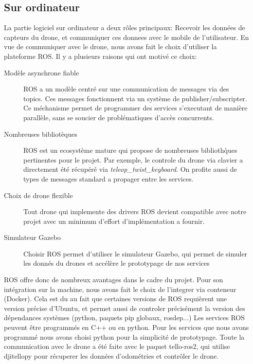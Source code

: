\documentclass{article}
\begin{document}
\subsection{Sur ordinateur}
La partie logiciel sur ordinateur a deux r\^oles principaux: Recevoir les donn\'ees de
capteurs du drone, et communiquer ces donnees avec le mobile de l'utilisateur.
En vue de communiquer avec le drone, nous avons fait le choix d'utiliser la
plateforme ROS. Il y a plusieurs raisons qui ont motiv\'e ce choix:
\begin{description}
    \item[Mod\`ele asynchrone fiable] ROS a un mod\`ele centr\'e sur une
    communication de messages via des topics. Ces messages fonctionnent via un syst\`eme de publisher/subscripter. Ce m\'echanisme permet de programmer des services s'executant de mani\`ere parall\`ele, sans se soucier de probl\'ematiques d'acc\`es concurrents.
    \item[Nombreuses bibliot\`eques] ROS est un ecosyst\`eme mature qui propose
    de nombreuses biblioth\`ques pertinentes pour le projet. Par exemple, le
    controle du drone via clavier a directement \'et\'e r\'ecup\'er\'e via
    \textit{teleop\_twist\_keyboard}. On profite aussi de types de messages standard a propager entre les services.
    \item[Choix de drone flexible] Tout drone qui implemente des drivers ROS
    devient compatible avec notre projet avec un minimum d'effort
    d'impl\'ementation a fournir.
    \item[Simulateur Gazebo] Choisir ROS permet d'utiliser le simulateur Gazebo, qui permet de simuler les donn\'es du drones et acc\'el\`ere le prototypage de nos services
\end{description}
ROS offre donc de nombreux avantages dans le cadre du projet. Pour son
int\'egration sur la machine, nous avons fait le choix de l'integrer via
conteneur (Docker). Cela est du au fait que certaines versions de ROS
requi\`erent une version pr\'ecise d'Ubuntu, et permet aussi de controler
pr\'ecis\'ement la version des d\'ependances syst\`emes (python, paquets pip
globaux, rosdep...) Les services ROS peuvent \^etre programm\'es en C++ ou en
python. Pour les services que nous avons programm\'e nous avons choisi python
pour la simplicit\'e de prototypage.
Toute la communication avec le drone a \'et\'e faite avec le paquet tello-ros2\cite{telloros}, qui utilise djitellopy\cite{djitellopy} pour r\'ecuperer les donn\'ees d'odom\'etries et contr\^oler le drone.
\end{document}
